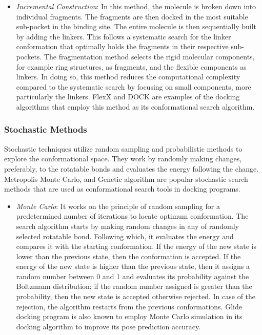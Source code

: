 \documentclass[10pt,letterpaper]{article}
\begin{document}
{{\begin{itemize}
    \item \textit{Incremental Construction}: In this method\cite{bib17}, the molecule is broken down into individual fragments. The fragments are then docked in the most suitable sub-pocket in the binding site. The entire molecule is then sequentially built by adding the linkers. This follows a systematic search for the linker conformation that optimally holds the fragments in their respective sub-pockets. The fragmentation method selects the rigid molecular components, for example ring structures, as fragments, and the flexible components as linkers. In doing so, this method reduces the computational complexity compared to the systematic search by focusing on small components, more particularly the linkers. FlexX\cite{bib19} and DOCK\cite{bib18} are examples of the docking algorithms that employ this method as its conformational search algorithm.
\end{itemize}

\subsubsection*{Stochastic Methods}
Stochastic techniques utilize random sampling and probabilistic methods to explore the conformational space. They work by randomly making changes, preferably, to the rotatable bonds and evaluates the energy following the change. Metropolis Monte Carlo, and Genetic algorithm are popular stochastic search methods that are used as conformational search tools in docking programs. 

\begin{itemize}
    \item \textit{Monte Carlo}: It works on the principle of random sampling for a predetermined number of iterations to locate optimum conformation. The search algorithm starts by making random changes in any of randomly selected rotatable bond. Following which, it evaluates the energy and compares it with the starting conformation. If the energy of the new state is lower than the previous state, then the conformation is accepted. If the energy of the new state is higher than the previous state, then it assigns a random number between 0 and 1 and evaluates its probability against the Boltzmann distribution; if the random number assigned is greater than the probability, then the new state is accepted otherwise rejected. In case of the rejection, the algorithm restarts from the previous conformations. Glide\cite{bib15} docking program is also known to employ Monte Carlo simulation in its docking algorithm to improve its pose prediction accuracy.
   

\end{itemize}}}
\end{document}

